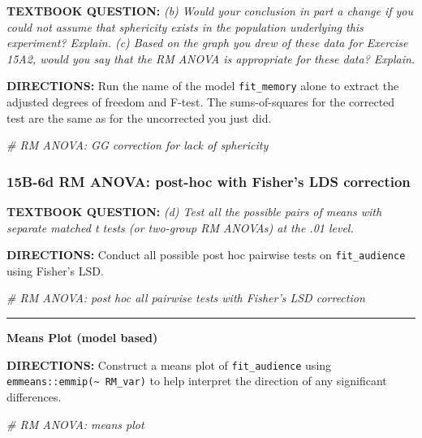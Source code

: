 \documentclass[]{article}
\newenvironment{Shaded}{\begin{snugshade}}{\end{snugshade}}
\newcommand{\CommentTok}[1]{\textcolor[rgb]{0.56,0.35,0.01}{\textit{#1}}}
\begin{document}
\textbf{TEXTBOOK QUESTION:} \emph{(b) Would your conclusion in part a
change if you could not assume that sphericity exists in the population
underlying this experiment? Explain. (c) Based on the graph you drew of
these data for Exercise 15A2, would you say that the RM ANOVA is
appropriate for these data? Explain.}

\textbf{DIRECTIONS:} Run the name of the model \texttt{fit\_memory}
alone to extract the adjusted degrees of freedom and F-test. The
sums-of-squares for the corrected test are the same as for the
uncorrected you just did.

\begin{Shaded}
\begin{Highlighting}[]
\CommentTok{# RM ANOVA: GG correction for lack of sphericity}
\end{Highlighting}
\end{Shaded}

\clearpage

\subsubsection{15B-6d RM ANOVA: post-hoc with Fisher's LDS
correction}\label{b-6d-rm-anova-post-hoc-with-fishers-lds-correction}

\textbf{TEXTBOOK QUESTION:} \emph{(d) Test all the possible pairs of
means with separate matched t tests (or two-group RM ANOVAs) at the .01
level.}

\textbf{DIRECTIONS:} Conduct all possible post hoc pairwise tests on
\texttt{fit\_audience} using Fisher's LSD.

\begin{Shaded}
\begin{Highlighting}[]
\CommentTok{# RM ANOVA: post hoc all pairwise tests with Fisher's LSD correction}
\end{Highlighting}
\end{Shaded}

\begin{center}\rule{0.5\linewidth}{\linethickness}\end{center}

\textbf{Means Plot (model based)}

\textbf{DIRECTIONS:} Construct a means plot of \texttt{fit\_audience}
using \texttt{emmeans::emmip(\textasciitilde{}\ RM\_var)} to help
interpret the direction of any significant differences.

\begin{Shaded}
\begin{Highlighting}[]
\CommentTok{# RM ANOVA: means plot}
\end{Highlighting}
\end{Shaded}
\end{document}
